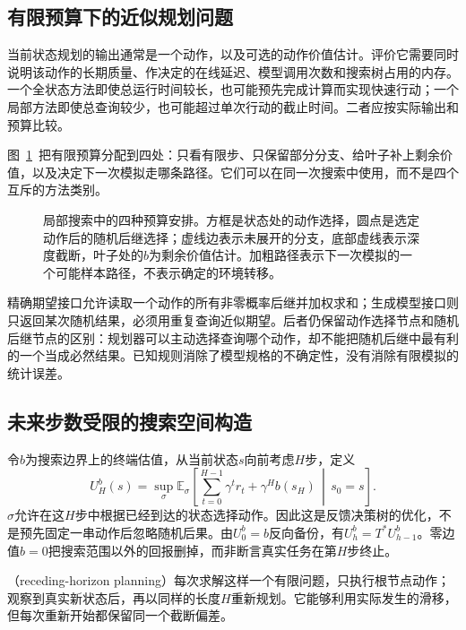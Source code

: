 \subsection{有限预算下的近似规划问题}
\label{sec:rl-planning-local-budget}

当前状态规划的输出通常是一个动作，以及可选的动作价值估计。评价它需要同时说明该动作的长期质量、作决定的在线延迟、模型调用次数和搜索树占用的内存。一个全状态方法即使总运行时间较长，也可能预先完成计算而实现快速行动；一个局部方法即使总查询较少，也可能超过单次行动的截止时间。二者应按实际输出和预算比较。

图~\ref{fig:rl-planning-search-tree}~把有限预算分配到四处：只看有限步、只保留部分分支、给叶子补上剩余价值，以及决定下一次模拟走哪条路径。它们可以在同一次搜索中使用，而不是四个互斥的方法类别。

\begin{figure}[htbp]
 \centering
 
 \caption{局部搜索中的四种预算安排。方框是状态处的动作选择，圆点是选定动作后的随机后继选择；虚线边表示未展开的分支，底部虚线表示深度截断，叶子处的$b$为剩余价值估计。加粗路径表示下一次模拟的一个可能样本路径，不表示确定的环境转移。}
 \label{fig:rl-planning-search-tree}
\end{figure}

精确期望接口允许读取一个动作的所有非零概率后继并加权求和；生成模型接口则只返回某次随机结果，必须用重复查询近似期望。后者仍保留动作选择节点和随机后继节点的区别：规划器可以主动选择查询哪个动作，却不能把随机后继中最有利的一个当成必然结果。已知规则消除了模型规格的不确定性，没有消除有限模拟的统计误差。

\subsection{未来步数受限的搜索空间构造}
\label{sec:rl-planning-horizon-search}

令$b$为搜索边界上的终端估值，从当前状态$s$向前考虑$H$步，定义
\begin{equation}
 U_H^b(s)=\sup_\sigma\mathbb E_\sigma\!\left[
 \sum_{t=0}^{H-1}\gamma^t r_t+\gamma^H b(s_H)
 \,\middle|\,s_0=s\right].
 \label{eq:rl-planning-lookahead}
\end{equation}
$\sigma$允许在这$H$步中根据已经到达的状态选择动作。因此这是反馈决策树的优化，不是预先固定一串动作后忽略随机后果。由$U_0^b=b$反向备份，有$U_h^b=T^*U_{h-1}^b$。零边值$b=0$把搜索范围以外的回报删掉，而非断言真实任务在第$H$步终止。

（receding-horizon planning）每次求解这样一个有限问题，只执行根节点动作；观察到真实新状态后，再以同样的长度$H$重新规划。它能够利用实际发生的滑移，但每次重新开始都保留同一个截断偏差。


